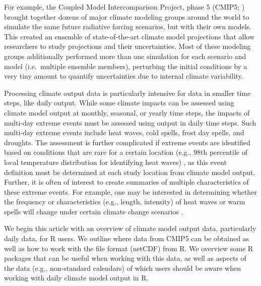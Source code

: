 For example, the Coupled Model Intercomparison Project, phase 5 (CMIP5;
\citet{taylor2012overview}) brought together dozens of major climate
modeling groups around the world to simulate the same future radiative
forcing scenarios, but with their own models. This created an ensemble
of state-of-the-art climate model projections that allow researchers to
study projections and their uncertainties. Most of these modeling groups
additionally performed more than one simulation for each scenario and
model (i.e.~multiple ensemble members), perturbing the initial
conditions by a very tiny amount to quantify uncertainties due to
internal climate variability.

Processing climate output data is particularly intensive for data in
smaller time steps, like daily output. While some climate impacts can be
assessed using climate model output at monthly, seasonal, or yearly time
steps, the impacts of multi-day extreme events must be assessed using
output in daily time steps. Such multi-day extreme events include heat
waves, cold spells, frost day spells, and droughts. The assessment is
further complicated if extreme events are identified based on conditions
that are rare for a certain location (e.g., 98th percentile of local
temperature distribution for identifying heat waves) \citep{IPCCch1}, as
this event definition must be determined at each study location from
climate model output. Further, it is often of interest to create
summaries of multiple characteristics of these extreme events. For
example, one may be interested in determining whether the frequency or
characteristics (e.g., length, intensity) of heat waves or warm spells
will change under certain climate change scenarios \citep{IPCCch1}.

We begin this article with an overview of climate model output data,
particularly daily data, for R users. We outline where data from CMIP5
can be obtained as well as how to work with the file format (netCDF)
from R. We overview some R packages that can be useful when working with
this data, as well as aspects of the data (e.g., non-standard calendars)
of which users should be aware when working with daily climate model
output in R.

